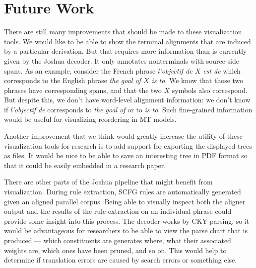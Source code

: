 \documentclass[logo]{pbml}
\begin{document}
%



\section{Future Work}

There are still many improvements that should be made to these visualization
tools. %
We would like to be able to show the terminal alignments
that are induced by a particular derivation. But that requires more information
than is currently given by the Joshua decoder.
It only annotates nonterminals with
source-side spans.
As an example, consider the French phrase {\it l'objectif de $X$ est de}
 which corresponds to the English phrase {\it the goal of $X$ is to}. We know
 that those two phrases have corresponding spans, and that the two $X$ symbols
 also correspond. But despite this, we don't have word-level alignment
information: we don't know if {\it l'objectif de} corresponds to {\it the goal
of} or to {\it is to}. Such fine-grained information would be useful for
visualizing reordering in MT models.

Another improvement that we think would greatly increase the utility of these
visualization tools for research is to add support for exporting the displayed
trees as files. It would be nice to be able to  save an interesting tree in PDF format so that it could be easily embedded in a research paper.

There are other parts of the Joshua pipeline that might benefit
from visualization. During rule extraction, SCFG rules are automatically
generated given an aligned parallel corpus. Being able to visually inspect
both the aligner output and the results of the rule extraction on an individual
phrase could provide some insight into this process.
The decoder works by CKY
parsing, so it would be advantageous for researchers to be able to view the
parse chart that is produced --- which constituents are generates where, what
their associated weights are, which ones have been pruned, and so on. This
 would help to determine if translation errors are caused by search errors
 or something else.
\end{document}

